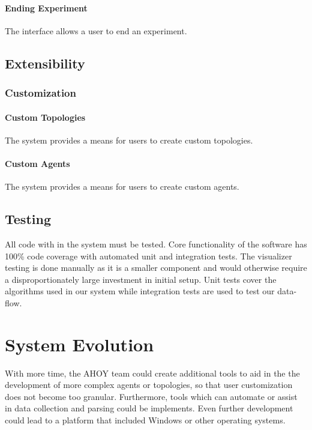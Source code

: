 \documentclass[titlepage]{article}
\begin{document}
    \paragraph{Ending Experiment} The interface allows a user to end an experiment.


\subsection{Extensibility%
  \label{extensibility}%
}
\subsubsection{Customization}
    \paragraph{Custom Topologies} The system provides a means for users to create custom topologies.
    \paragraph{Custom Agents} The system provides a means for users to create custom agents.

\subsection{Testing%
    \label{testing}%
}
All code with in the system must be tested. Core functionality of the software has 100\% code coverage with automated unit and integration tests.  The visualizer testing is done manually as it is a smaller component and would otherwise require a disproportionately large investment in initial setup.  Unit tests cover the algorithms used in our system while integration tests are used to test our data-flow.  

\section{System Evolution}

With more time, the AHOY team could create additional tools to aid in the the development of more complex agents or topologies, so that user customization does not become too granular.  Furthermore, tools which can automate or assist in data collection and parsing could be implements.  Even further development could lead to a platform that included Windows or other operating systems.
\end{document}
